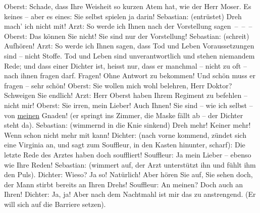            \pstart
           Oberst: Schade, dass Ihre Weisheit so kurzen Atem hat, wie der Herr Moser. Es \label{T_L01900-3v}\label{T_L01900-3h} keines – aber es \label{T_L01900-2v}\label{T_L01900-2h} eines: Sie selbst spielen ja darin!\pend
           \pstart
           Sebastian: (entrüstet)  Dreh mach’ ich nicht
					mit!\pend
           \pstart
           Arzt: So werde ich Ihnen nach der Vorstellung sagen – – –\pend
           \pstart
           Oberst: Das können Sie nicht! Sie sind nur  der
					Vorstellung!\pend
           \pstart
           Sebastian: (schreit) Aufhören!\pend
           \pstart
           Arzt: So werde ich Ihnen sagen, dass Tod und Leben Voraussetzungen sind – nicht
					Stoffe. Tod und Leben sind unverantwortlich und stehen niemandem Rede; und dass
					einer Dichter ist, heisst nur, dass er manchmal – nicht zu oft – nach ihnen
					fragen darf. Fragen! Ohne Antwort zu bekommen! Und schön muss er fragen – sehr
					schön!\pend
           \pstart
           Oberst: Sie wollen mich wohl belehren, Herr Doktor? Schweigen Sie endlich!\pend
           \pstart
           Arzt: Herr Oberst haben Ihrem Regiment zu befehlen – nicht mir!\pend
           \pstart
           Oberst: Sie irren, mein Lieber! Auch Ihnen! Sie sind – wie ich selbst – von \uline{meinen} Gnaden! (er springt ins Zimmer, die Maske
					fällt ab – der Dichter steht da).\pend
           \pstart
           Sebastian: (wimmernd in die Knie sinkend)  Dreh
					mehr! Keiner mehr! Wenn  schon nicht mehr mit
					kann!\pend
           \pstart
           Dichter: (nach vorne kommend, zündet sich eine Virginia an, und sagt zum
					Souffleur, in den Kasten hinunter, scharf): {\pb}Die letzte Rede des Arztes
					haben doch  souffliert!\pend
           \pstart
           Souffleur: Ja mein Lieber – ebenso wie Ihre Reden!\pend
           \pstart
           Sebastian: (wimmert auf, der Arzt unterstützt ihn und fühlt ihm den Puls).\pend
           \pstart
           Dichter: Wieso? Ja so! Natürlich! Aber hören Sie auf, Sie sehen doch, der Mann
					stirbt bereits an Ihren Drehs!\pend
           \pstart
           Souffleur: An meinen? Doch auch an Ihren!\pend
           \pstart
           Dichter: Ja, ja! Aber nach dem Nachtmahl ist mir das zu anstrengend. (Er will
					sich auf die Barriere setzen).\pend
